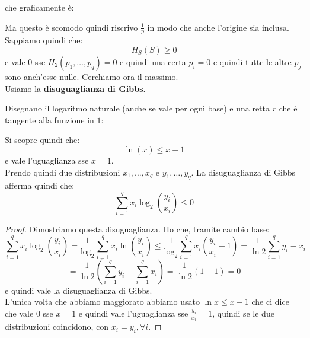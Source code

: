 \documentclass[a4paper,12pt, oneside]{book}
\begin{document}
che graficamente è:
\begin{figure}[H]
  \centering
\end{figure}
Ma questo è scomodo quindi riscrivo $\frac{1}{p}$ in modo che anche l'origine
sia inclusa. \\
Sappiamo quindi che:
\[H_S(S)\geq 0\]
e vale 0 sse $H_2(p_1,\ldots, p_q)=0$ e quindi una certa $p_i=0$ e quindi tutte
le altre $p_j$ sono anch'esse nulle.
Cerchiamo ora il massimo.\\
Usiamo la \textbf{disuguaglianza di Gibbs}.
\begin{teorema}
  Disegnano il logaritmo naturale (anche se vale per ogni base) e
  una retta $r$ che è tangente alla funzione in $1$:
  \begin{figure}[H]
    \centering
  \end{figure}
  Si scopre quindi che:
  \[\ln (x)\leq x-1\]
  e vale l'uguaglianza sse $x=1$.\\
  Prendo quindi due distribuzioni $x_1,\ldots, x_q$ e $y_1,\ldots, y_q$. La
  disuguaglianza di Gibbs afferma quindi che:
  \[\sum_{i=1}^q x_i\log_2\left(\frac{y_i}{x_i}\right)\leq 0\]
\end{teorema}
\begin{proof}
  Dimostriamo questa disuguaglianza. Ho che, tramite cambio base:
  \[\sum_{i=1}^q
    x_i\log_2\left(\frac{y_i}{x_i}\right)=\frac{1}{\log_2}\sum_{i=1}^q
    x_i\ln\left(\frac{y_i}{x_i}\right)\leq \frac{1}{\log_2}\sum_{i=1}^q
    x_i\left(\frac{y_i}{x_i}-1\right)=\frac{1}{\ln 2}\sum_{i=1}^q y_i-x_i\]
  \[=\frac{1}{\ln 2}\left(\sum_{i=1}^q y_i-\sum_{i=1}^q x_i\right)=\frac{1}{\ln
      2}(1-1)=0\]
  e quindi vale la disuguaglianza di Gibbs.\\
  L'unica volta che abbiamo maggiorato abbiamo usato $\ln x\leq x-1$ che ci
  dice che vale $0$ sse  $x=1$ e quindi vale l'uguaglianza sse
  $\frac{y_i}{x_i}=1$, quindi se le due distribuzioni coincidono, con
  $x_i=y_i,\forall i$.
\end{proof}
\end{document}
